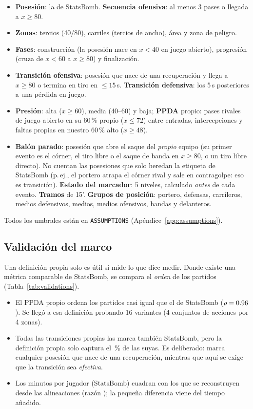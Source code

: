 \documentclass[11pt,a4paper]{article}
\DeclareRobustCommand{\col}[1]{\texttt{\detokenize{#1}}}
\begin{document}
\begin{itemize}
  \item \textbf{Posesión}: la de StatsBomb. \textbf{Secuencia ofensiva}: al menos 3 pases o llegada a $x\geq80$.
  \item \textbf{Zonas}: tercios (40/80), carriles (tercios de ancho), área y zona de peligro.
  \item \textbf{Fases}: construcción (la posesión nace en $x<40$ en juego abierto), progresión (cruza de $x<60$ a
        $x\geq80$) y finalización.
  \item \textbf{Transición ofensiva}: posesión que nace de una recuperación y llega a $x\geq80$ o termina en tiro en
        $\leq15$\,s. \textbf{Transición defensiva}: los 5\,s posteriores a una pérdida en juego.
  \item \textbf{Presión}: alta ($x\geq60$), media (40--60) y baja; \textbf{PPDA} propio: pases rivales de juego abierto
        en su 60\,\% propio ($x\leq72$) entre entradas, intercepciones y faltas propias en nuestro 60\,\% alto
        ($x\geq48$).
  \item \textbf{Balón parado}: posesión que abre el saque del \emph{propio} equipo (su primer evento es el córner, el tiro
        libre o el saque de banda en $x\geq80$, o un tiro libre directo). No cuentan las posesiones que solo heredan la
        etiqueta de StatsBomb (p.\,ej., el portero atrapa el córner rival y sale en contragolpe: eso es transición).
        \textbf{Estado del marcador}: 5 niveles,
        calculado \emph{antes} de cada evento. \textbf{Tramos} de 15'. \textbf{Grupos de posición}: portero, defensas,
        carrileros, medios defensivos, medios, medios ofensivos, bandas y delanteros.
\end{itemize}
Todos los umbrales están en \texttt{ASSUMPTIONS} (Apéndice~\ref{app:assumptions}).

\subsection{Validación del marco}
Una definición propia solo es útil si mide lo que dice medir. Donde existe una métrica comparable de StatsBomb, se
compara el \emph{orden} de los partidos (Tabla~\ref{tab:validations}).



\begin{itemize}
  \item El PPDA propio ordena los partidos casi igual que el de StatsBomb ($\rho=0.96$). Se llegó a esa definición
        probando 16 variantes (4 conjuntos de acciones por 4 zonas).
  \item Todas las transiciones propias las marca también StatsBomb, pero la definición propia solo captura el
        \pctTransSB\,\% de las suyas. Es deliberado: \col{is_transition} marca cualquier posesión que nace de una
        recuperación, mientras que aquí se exige que la transición sea \emph{efectiva}.
  \item Los minutos por jugador (StatsBomb) cuadran con los que se reconstruyen desde las alineaciones (razón
        \ratioMin); la pequeña diferencia viene del tiempo añadido.
\end{itemize}
\end{document}
